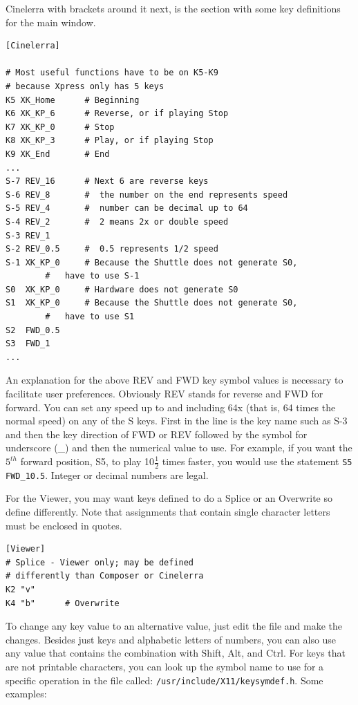 Cinelerra with brackets around it next, is the section with some key
definitions for the main window.

\begin{lstlisting}[style=sh]
[Cinelerra]

# Most useful functions have to be on K5-K9
# because Xpress only has 5 keys
K5 XK_Home      # Beginning
K6 XK_KP_6      # Reverse, or if playing Stop
K7 XK_KP_0      # Stop
K8 XK_KP_3      # Play, or if playing Stop
K9 XK_End       # End
...
S-7 REV_16     	# Next 6 are reverse keys
S-6 REV_8      	#  the number on the end represents speed
S-5 REV_4      	#  number can be decimal up to 64
S-4 REV_2      	#  2 means 2x or double speed
S-3 REV_1
S-2 REV_0.5    	#  0.5 represents 1/2 speed
S-1 XK_KP_0    	# Because the Shuttle does not generate S0,
		#   have to use S-1
S0  XK_KP_0   	# Hardware does not generate S0
S1  XK_KP_0   	# Because the Shuttle does not generate S0,
		#   have to use S1
S2  FWD_0.5
S3  FWD_1
...
\end{lstlisting}

An explanation for the above REV and FWD key symbol values is
necessary to facilitate user preferences.  Obviously REV stands for
reverse and FWD for forward.  You can set any speed up to and
including 64x (that is, 64 times the normal speed) on any of the S
keys.  First in the line is the key name such as S-3 and then the
key direction of FWD or REV followed by the symbol for underscore
(\_) and then the numerical value to use.  For example, if you want
the $5^{th}$ forward position, S5, to play 10$\frac{1}{2}$ times
faster, you would use the statement \texttt{S5 FWD\_10.5}.  Integer
or decimal numbers are legal.

For the Viewer, you may want keys defined to do a Splice or an
Overwrite so define differently.  Note that assignments that contain
single character letters must be enclosed in quotes.

\begin{lstlisting}[style=sh]
[Viewer]
# Splice - Viewer only; may be defined
# differently than Composer or Cinelerra
K2 "v"
K4 "b"		# Overwrite
\end{lstlisting}

To change any key value to an alternative value, just edit the file
and make the changes.  Besides just keys and alphabetic letters of
numbers, you can also use any \CGG{} value that contains the
combination with Shift, Alt, and Ctrl.  For keys that are not
printable characters, you can look up the symbol name to use for a
specific operation in the file called:
\texttt{/usr/include/X11/keysymdef.h}. Some examples:

